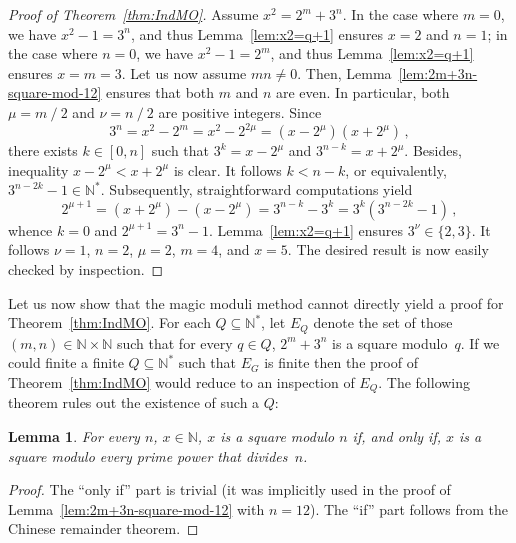 \documentclass[12pt]{article}
\newcommand{\bZ}{\mathbb{Z}}
\newcommand{\bN}{\mathbb{N}} %
\newcommand{\bNast}{\bN^*}
\newcommand{\binover}{\mathbin{/}}
\newtheorem{lemma}{Lemma}
\theoremstyle{definition}
\begin{document}
   
   \begin{proof}[Proof of Theorem~\ref{thm:IndMO}]
     Assume $x^2 = 2^m + 3^n$.
     In the case where $m = 0$,
     we have $x^2 - 1 = 3^n$,
     and thus Lemma~\ref{lem:x2=q+1} ensures $x = 2$ and $n = 1$;
     in the case where $n = 0$,
     we have $x^2 - 1 = 2^m$,
     and thus Lemma~\ref{lem:x2=q+1} ensures $x = m = 3$.
     Let us now assume $mn \ne 0$.
     Then, Lemma~\ref{lem:2m+3n-square-mod-12} ensures that both $m$ and $n$ are even.
     In particular, both $\mu = m \binover 2$ and $\nu = n \binover 2$ are positive integers.
     Since 
     $$
     3^n = x^2 - 2^m = x^2 - 2^{2\mu} = (x - 2^\mu)(x + 2^\mu) \,, 
     $$
     there exists $k \in [0, n]$ such that $3^k = x - 2^\mu$ and $3^{n - k} = x + 2^\mu$.
     Besides, inequality $x - 2^\mu < x + 2^\mu$ is clear. 
     It follows $k < n - k$, or equivalently, $3^{n - 2 k} - 1 \in \bNast$.
     Subsequently, straightforward computations yield
     $$
     2^{\mu + 1} = (x + 2^\mu) - (x - 2^\mu) = 3^{n - k} - 3^k = 3^k \left( 3^{n - 2k} - 1 \right) \,,
     $$
     whence $k = 0$ and $2^{\mu + 1} = 3^n - 1$.
     Lemma~\ref{lem:x2=q+1} ensures $3^\nu \in \{ 2, 3 \}$.
     It follows $\nu = 1$, $n = 2$, $\mu = 2$, $m = 4$, and $x = 5$.
     The desired result is now easily checked by inspection. 
  \end{proof}

  Let us now show that 
  the magic moduli method cannot directly yield a proof for Theorem~\ref{thm:IndMO}.
  For each $Q \subseteq \bNast$,
  let $E_Q$ denote the set of those $(m, n) \in \bN \times \bN$ such that for every $q \in Q$,
  $2^m + 3^n$ is a square modulo~$q$.
  If we could finite a finite $Q \subseteq \bNast$ such that $E_G$ is finite
  then the proof of Theorem~\ref{thm:IndMO} would reduce to an inspection of $E_Q$.
  The following theorem rules out the existence of such a $Q$:

  \begin{lemma} \label{lem:square-mn-m-n}
   For every $n$, $x \in \bN$, 
   $x$ is a square modulo $n$
   if, and only if, $x$ is a square modulo every prime power that divides~$n$.
 \end{lemma}

 \begin{proof}
   The ``only if'' part is trivial
   (it was implicitly  used in the proof of Lemma~\ref{lem:2m+3n-square-mod-12} with $n = 12$).
   The ``if'' part follows from the Chinese remainder theorem.
 \end{proof} 
\end{document}
